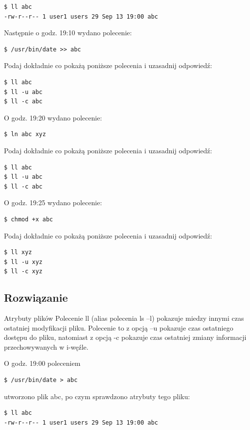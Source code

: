 \documentclass[11pt]{article}
\begin{document}
\begin{verbatim}
$ ll abc
-rw-r--r-- 1 user1 users 29 Sep 13 19:00 abc
\end{verbatim}

Następnie o godz. 19:10 wydano polecenie:

\begin{verbatim}
$ /usr/bin/date >> abc
\end{verbatim}

Podaj dokładnie co pokażą poniższe polecenia i uzasadnij odpowiedź:

\begin{verbatim}
$ ll abc
$ ll -u abc
$ ll -c abc
\end{verbatim}

O godz. 19:20 wydano polecenie:

\begin{verbatim}
$ ln abc xyz
\end{verbatim}
Podaj dokładnie co pokażą poniższe polecenia i uzasadnij odpowiedź:

\begin{verbatim}
$ ll abc
$ ll -u abc
$ ll -c abc
\end{verbatim}
O godz. 19:25 wydano polecenie:

\begin{verbatim}
$ chmod +x abc
\end{verbatim}
Podaj dokładnie co pokażą poniższe polecenia i uzasadnij odpowiedź:

\begin{verbatim}
$ ll xyz
$ ll -u xyz
$ ll -c xyz
\end{verbatim}

\subsection{Rozwiązanie}

Atrybuty plików
Polecenie ll (alias polecenia ls –l) pokazuje miedzy innymi czas
ostatniej modyfikacji pliku. Polecenie to z opcją –u pokazuje czas
ostatniego dostępu do pliku, natomiast z opcją -c pokazuje czas
ostatniej zmiany informacji przechowywanych w i-węźle.

O godz. 19:00 poleceniem
\begin{verbatim}
$ /usr/bin/date > abc
\end{verbatim}

utworzono plik abc, po czym sprawdzono atrybuty tego pliku:

\begin{verbatim}
$ ll abc
-rw-r--r-- 1 user1 users 29 Sep 13 19:00 abc
\end{verbatim}
\end{document}
